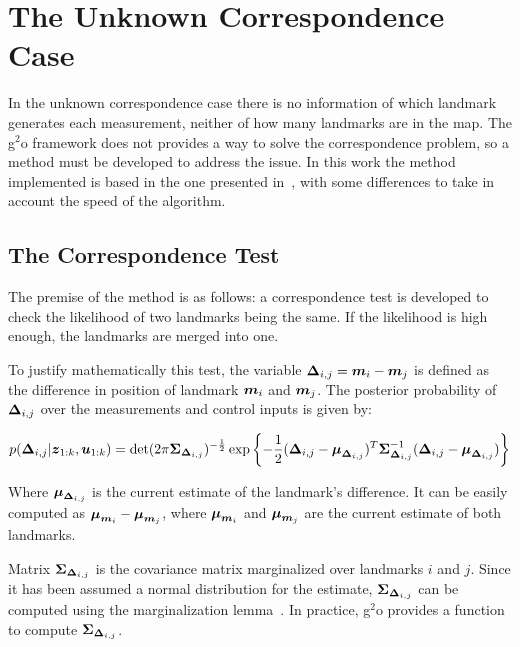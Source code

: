 \section{The Unknown Correspondence Case}

In the unknown correspondence case there is no information of which landmark generates each measurement, neither of how many landmarks are in the map. The g$^2$o framework does not provides a way to solve the correspondence problem, so a method must be developed to address the issue. In this work the method implemented is based in the one presented in~\cite{graphslam}, with some differences to take in account the speed of the algorithm. 

\subsection{The Correspondence Test}

The premise of the method is as follows: a correspondence test is developed to check the likelihood of two landmarks being the same. If the likelihood is high enough, the landmarks are merged into one. 

To justify mathematically this test, the variable $\boldsymbol{\Delta}_{i,j}=\boldsymbol{m}_i-\boldsymbol{m}_j$ is defined as the difference in position of landmark $\boldsymbol{m}_i$ and $\boldsymbol{m}_j$. The posterior probability of $\boldsymbol{\Delta}_{i,j}$ over the measurements and control inputs is given by:

\begin{equation}
p(\boldsymbol{\Delta}_{i,j}|\boldsymbol{z}_{1:k},\boldsymbol{u}_{1:k})=
\det(2\pi \boldsymbol{\Sigma}_{\boldsymbol{\Delta}_{i,j}})^{-\frac{1}{2}}\exp\left\lbrace -\frac{1}{2}(\boldsymbol{\Delta}_{i,j}-\boldsymbol{\mu}_{\boldsymbol{\Delta}_{i,j}})^T
\boldsymbol{\Sigma}_{\boldsymbol{\Delta}_{i,j}}^{-1}(\boldsymbol{\Delta}_{i,j}-\boldsymbol{\mu}_{\boldsymbol{\Delta}_{i,j}})\right\rbrace
\label{eq:correspondence-test}
\end{equation}

Where $\boldsymbol{\mu}_{\boldsymbol{\Delta}_{i,j}}$ is the current estimate of the landmark's difference. It can be easily computed as $\boldsymbol{\mu}_{\boldsymbol{m}_i}-\boldsymbol{\mu}_{\boldsymbol{m}_j}$, where $\boldsymbol{\mu}_{\boldsymbol{m}_i}$ and $\boldsymbol{\mu}_{\boldsymbol{m}_j}$ are the current estimate of both landmarks.

Matrix $\boldsymbol{\Sigma}_{\boldsymbol{\Delta}_{i,j}}$ is the covariance matrix marginalized over landmarks $i$ and $j$. Since it has been assumed a normal distribution for the estimate, $\boldsymbol{\Sigma}_{\boldsymbol{\Delta}_{i,j}}$ can be computed using the marginalization lemma~\cite{graphslam}. In practice, g$^2$o provides a function to compute $\boldsymbol{\Sigma}_{\boldsymbol{\Delta}_{i,j}}$.


